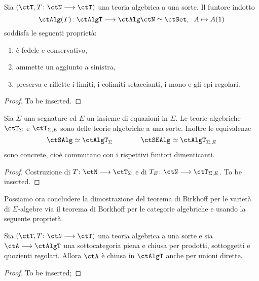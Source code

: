 \begin{proposition}\label{prop_funt_ind_unasorte}
	Sia \((\ctT, T \colon \ctN \fun \ctT)\) una teoria algebrica a una sorte. Il funtore indotto
	\[
		\ctAlg(T) \colon \ctAlgT \fun \ctAlg\ctN \simeq \ctSet , \;\; A \mapsto A(1)
	\]
	soddisfa le seguenti proprietà:
	\begin{enumerate}
		\item è fedele e conservativo,
		\item ammette un aggiunto a sinistra,
		\item preserva e riflette i limiti, i colimiti setaccianti, i mono e gli epi regolari.
	\end{enumerate}
\end{proposition}

\begin{proof}
	To be inserted.
\end{proof}

\begin{proposition}\label{prop_confr_sigma_tunasorte}
	Sia \(\Sigma\) una segnature ed \(E\) un insieme di equazioni in \(\Sigma\). Le teorie algebriche \(\ctT_{\Sigma}\) e \(\ctT_{\Sigma,E}\)
	sono delle teorie algebriche a una sorte. Inoltre le equivalenze
	\[
		\ctSAlg \simeq \ctAlgT_{\Sigma} \qquad\qquad \ctSEAlg \simeq \ctAlgT_{\Sigma,E}
	\]
	sono concrete, cioè commutano con i rispettivi funtori dimenticanti.
\end{proposition}

\begin{proof}
	Costruzione di \(T \colon \ctN \fun \ctT_{\Sigma}\) e di \(T_E \colon \ctN \fun \ctT_{\Sigma,E}\). To be inserted.
\end{proof}

Possiamo ora concludere la dimostrazione del teorema di Birkhoff per le varietà di \(\Sigma\)-algebre via il teorema di Borkhoff
per le categorie algebriche e usando la seguente proprietà.

\begin{proposition}\label{prop_rid_Birkhoff}
	Sia \((\ctT, T \colon \ctN \fun \ctT)\) una teoria algebrica a una sorte e sia \(\ctA \fun \ctAlgT\) una sottocategoria piena e chiusa
	per prodotti, sottoggetti e quozienti regolari. Allora \(\ctA\) è chiusa in \(\ctAlgT\) anche per unioni dirette.
\end{proposition}

\begin{proof}
	To be inserted;
\end{proof}

